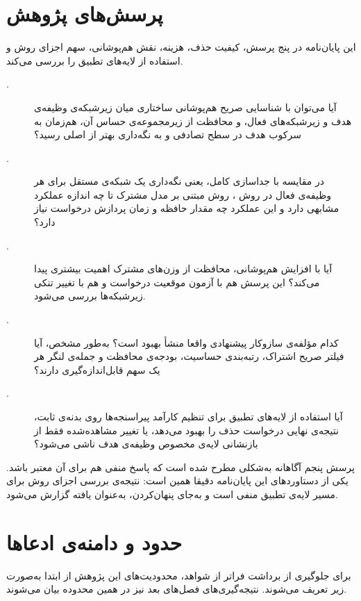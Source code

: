 \section{پرسش‌های پژوهش}
\label{sec:intro-questions}

این پایان‌نامه در پنج پرسش، کیفیت حذف، هزینه، نقش هم‌پوشانی، سهم اجزای روش و استفاده از لایه‌های تطبیق را بررسی می‌کند.

\begin{description}
	\item[.] آیا می‌توان با شناسایی صریح هم‌پوشانی ساختاری میان زیرشبکه‌ی وظیفه‌ی هدف و زیرشبکه‌های فعال، و محافظت از زیرمجموعه‌ی حساس آن، هم‌زمان به سرکوب هدف در سطح تصادفی و به نگه‌داری بهتر از  اصلی رسید؟
	\item[.] در مقایسه با جداسازی کامل، یعنی نگه‌داری یک شبکه‌ی مستقل برای هر وظیفه‌ی فعال در روش  \cite{liu2022clpu}، روش مبتنی بر مدل مشترک تا چه اندازه عملکرد مشابهی دارد و این عملکرد چه مقدار حافظه و زمان پردازش درخواست نیاز دارد؟
	\item[.] آیا با افزایش هم‌پوشانی، محافظت از وزن‌های مشترک اهمیت بیشتری پیدا می‌کند؟ این پرسش هم با آزمون موقعیت درخواست و هم با تغییر تنکی زیرشبکه‌ها بررسی می‌شود.
	\item[.] کدام مؤلفه‌ی سازوکار پیشنهادی واقعا منشأ بهبود است؟ به‌طور مشخص، آیا فیلتر صریح اشتراک، رتبه‌بندی حساسیت، بودجه‌ی محافظت و جمله‌ی لنگر هر یک سهم قابل‌اندازه‌گیری دارند؟
	\item[.] آیا استفاده از لایه‌های تطبیق برای تنظیم کارآمد پیراسنجه‌ها روی بدنه‌ی ثابت، نتیجه‌ی نهایی درخواست حذف را بهبود می‌دهد، یا تغییر مشاهده‌شده فقط از بازنشانی لایه‌ی مخصوص وظیفه‌ی هدف ناشی می‌شود؟
\end{description}

پرسش پنجم آگاهانه به‌شکلی مطرح شده است که پاسخ منفی هم برای آن معتبر باشد. یکی از دستاوردهای این پایان‌نامه دقیقا همین است: نتیجه‌ی بررسی اجزای روش برای مسیر لایه‌ی تطبیق منفی است و به‌جای پنهان‌کردن، به‌عنوان یافته گزارش می‌شود.

\section{حدود و دامنه‌ی ادعاها}
\label{sec:intro-scope}

برای جلوگیری از برداشت فراتر از شواهد، محدودیت‌های این پژوهش از ابتدا به‌صورت زیر تعریف می‌شوند. نتیجه‌گیری‌های فصل‌های بعد نیز در همین محدوده بیان می‌شوند.

